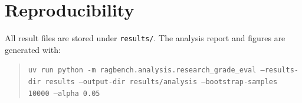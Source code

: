 \documentclass[10pt,twocolumn]{article}
\begin{document}
\section*{Reproducibility}
\small
All result files are stored under \texttt{results/}. The analysis report and figures are generated with:
\begin{quote}
\texttt{uv run python -m ragbench.analysis.research\_grade\_eval --results-dir results --output-dir results/analysis --bootstrap-samples 10000 --alpha 0.05}
\end{quote}



\end{document}
